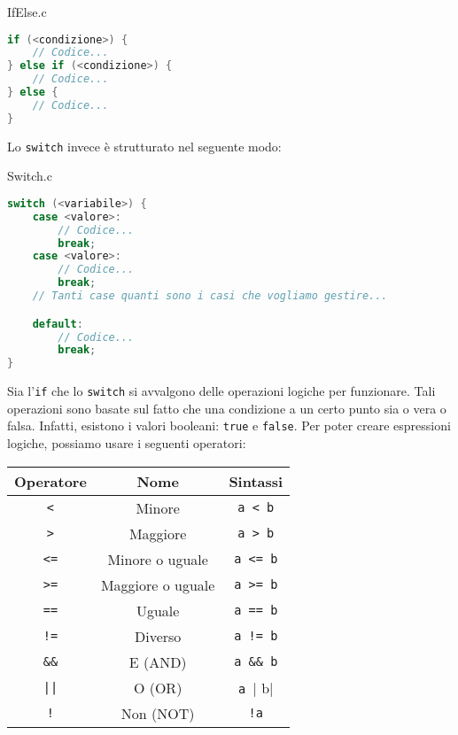 \begin{codeblock}{IfElse.c}
    \begin{lstlisting}[language = c]
if (<condizione>) {
    // Codice...
} else if (<condizione>) {
    // Codice...
} else {
    // Codice...
}\end{lstlisting}
\end{codeblock}

Lo \verb|switch| invece è strutturato nel seguente modo:

\begin{codeblock}{Switch.c}
    \begin{lstlisting}[language = c]
switch (<variabile>) {
    case <valore>:
        // Codice...
        break;
    case <valore>:
        // Codice...
        break;
    // Tanti case quanti sono i casi che vogliamo gestire...

    default:
        // Codice...
        break;
}\end{lstlisting}
\end{codeblock}

Sia l'\verb|if| che lo \verb|switch| si avvalgono delle operazioni logiche per funzionare. Tali operazioni sono basate sul fatto che una condizione a un certo punto sia o vera o falsa. Infatti, esistono i valori booleani: \verb|true| e \verb|false|.
\nl
Per poter creare espressioni logiche, possiamo usare i seguenti operatori:

\begin{center}
    \begin{tabular}{|c|c|c|}
        \hline
        \textbf{Operatore} & \textbf{Nome} & \textbf{Sintassi} \\
        \hline
        \verb|<| & Minore & \verb|a < b| \\
        \verb|>| & Maggiore & \verb|a > b| \\
        \verb|<=| & Minore o uguale & \verb|a <= b| \\
        \verb|>=| & Maggiore o uguale & \verb|a >= b| \\
        \verb|==| & Uguale & \verb|a == b| \\
        \verb|!=| & Diverso & \verb|a != b| \\
        \verb|&&| & E (AND) & \verb|a && b| \\
        \verb+||+ & O (OR) & \verb|a || b| \\
        \verb|!| & Non (NOT) & \verb|!a| \\
        \hline
    \end{tabular}
\end{center}

